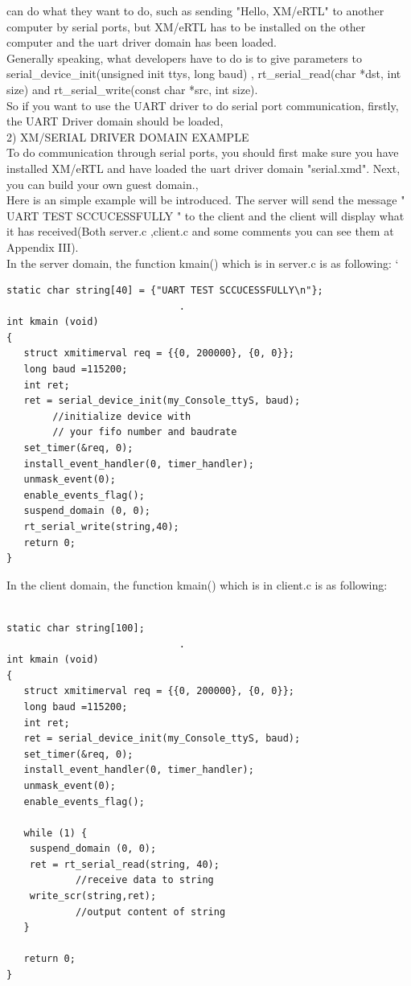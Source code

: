 can do what they want to do, such as sending "Hello, XM/eRTL" to another computer by serial ports, but XM/eRTL has to be installed on the 
other computer and the uart driver domain has been loaded.
\\
	Generally speaking, what developers have to do is to give parameters to serial\_device\_init(unsigned init ttys, long  baud) , rt\_serial\_read(char *dst, int size) and rt\_serial\_write(const char *src, int size).
\\
	So if you want to use the UART driver to do serial port communication, firstly, the UART Driver domain should be loaded,
\\
2)  XM/SERIAL DRIVER DOMAIN EXAMPLE
\\
To do communication through serial ports, you should first make sure you have installed XM/eRTL and have loaded the uart driver domain 
"serial.xmd". Next, you can build your own guest domain.,
\\
Here is an simple example will be introduced. The server will send the message " UART TEST SCCUCESSFULLY " to the client and the client will display what it has received(Both server.c ,client.c and some comments you can see them at Appendix III).
\\
	In the server domain, the function kmain() which is in server.c is as following:
\lstset{language=C}`
\begin{lstlisting}
static char string[40] = {"UART TEST SCCUCESSFULLY\n"};
							  .
int kmain (void) 
{
   struct xmitimerval req = {{0, 200000}, {0, 0}};
   long baud =115200;
   int ret;
   ret = serial_device_init(my_Console_ttyS, baud);  
		//initialize device with 
		// your fifo number and baudrate
   set_timer(&req, 0);
   install_event_handler(0, timer_handler);
   unmask_event(0);
   enable_events_flag();
   suspend_domain (0, 0);
   rt_serial_write(string,40);
   return 0;
}			
\end{lstlisting}
	In the client domain, the function kmain() which is in client.c is as following:
\lstset{language=C}
\begin{lstlisting}

static char string[100];
				    		  .
int kmain (void) 
{
   struct xmitimerval req = {{0, 200000}, {0, 0}};
   long baud =115200;
   int ret;
   ret = serial_device_init(my_Console_ttyS, baud);
   set_timer(&req, 0);
   install_event_handler(0, timer_handler);
   unmask_event(0);
   enable_events_flag();

   while (1) { 
	suspend_domain (0, 0);
	ret = rt_serial_read(string, 40);  
			//receive data to string
	write_scr(string,ret);		  
			//output content of string
   }

   return 0;
}
\end{lstlisting}

